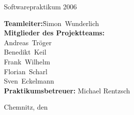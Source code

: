 
\begin{titlepage}
	\begin{center}
		\vfill
		{%
			\large Softwarepraktikum 2006\\[1.5ex]
		}
		\vfill \vfill

		\textbf{\Huge\dctitle}
		\vspace{1.5cm}
		
		\textbf{\Large\dcsubject}

		\textsc{\Large \dcsubtitle}
		\vfill \vfill
	\end{center}
	
	
	{%
		\begin{tabbing}
			\hspace{4.5cm}\=\textbf{Teamleiter:}\hspace{0.5cm}\=Simon~Wunderlich\\[2.0ex]
				\>\textbf{Mitglieder des Projektteams:}\\[1.5ex]
				\>            \>Andreas~Tröger \\[1.5ex]
				\>            \>Benedikt~Keil \\[1.5ex]
				\>            \>Frank~Wilhelm \\[1.5ex]
				\>            \>Florian~Scharl \\[1.5ex]
				\>            \>Sven~Eckelmann \\[4.0ex]
				\> \textbf{Praktikumsbetreuer:} Michael Rentzsch
		\end{tabbing}
	}
	\vfill
	
	{%
		Chemnitz, den \dcdate
	}
\end{titlepage}
